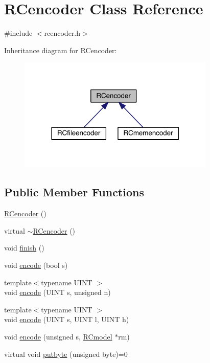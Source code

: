 \hypertarget{class_r_cencoder}{}\section{R\+Cencoder Class Reference}
\label{class_r_cencoder}


{\ttfamily \#include $<$rcencoder.\+h$>$}



Inheritance diagram for R\+Cencoder\+:\nopagebreak
\begin{figure}[H]
\begin{center}
\leavevmode
\includegraphics[width=266pt]{d0/d88/class_r_cencoder__inherit__graph}
\end{center}
\end{figure}
\subsection*{Public Member Functions}
\begin{DoxyCompactItemize}
\item 
\hyperlink{class_r_cencoder_a2df80ca35731d67b68e43b854475d501}{R\+Cencoder} ()
\item 
virtual \hyperlink{class_r_cencoder_aa8c6aee8859c80cbcc49a48c7b60b741}{$\sim$\+R\+Cencoder} ()
\item 
void \hyperlink{class_r_cencoder_a8d9d6d1b41096508952261f1e82faff7}{finish} ()
\item 
void \hyperlink{class_r_cencoder_ad1913e1c600b9d17f2497e0b61fc582c}{encode} (bool s)
\item 
{\footnotesize template$<$typename U\+I\+N\+T $>$ }\\void \hyperlink{class_r_cencoder_a11115793b42a2e5c32f3c2dd923c0131}{encode} (U\+I\+N\+T s, unsigned n)
\item 
{\footnotesize template$<$typename U\+I\+N\+T $>$ }\\void \hyperlink{class_r_cencoder_ada7720aab7ed6342af77859646db860b}{encode} (U\+I\+N\+T s, U\+I\+N\+T l, U\+I\+N\+T h)
\item 
void \hyperlink{class_r_cencoder_ac72b460dc738bad3d129cccf93a16c1b}{encode} (unsigned s, \hyperlink{class_r_cmodel}{R\+Cmodel} $\ast$rm)
\item 
virtual void \hyperlink{class_r_cencoder_abacabd0442d9588c58136caa38f10204}{putbyte} (unsigned byte)=0
\end{DoxyCompactItemize}



